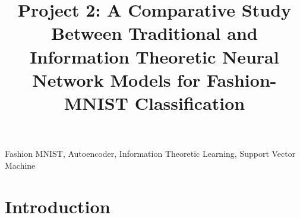 \documentclass[conference]{IEEEtran}
\begin{document}
\title{Project 2: A Comparative Study Between Traditional and Information Theoretic Neural Network Models for Fashion-MNIST Classification}
\author{

}

\maketitle


\begin{abstract}
	
\end{abstract} 

\begin{IEEEkeywords}
Fashion MNIST, Autoencoder, Information Theoretic Learning, Support Vector Machine
\end{IEEEkeywords}

\section{Introduction} 
\end{document}
